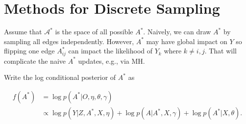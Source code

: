 \documentclass[12pt]{article}
\begin{document}
\section{Methods for Discrete Sampling}
Assume that $\mathcal{A}^\ast$ is the space of all possible $A^\ast$.
Naively, we can draw $A^\ast$ by sampling all edges independently. 
However, $A^\ast$ may have global impact on $Y$ so flipping one edge $A^\ast_{ij}$
can impact the likelihood of $Y_k$ where $k \neq i,j$. 
That will complicate the naive $A^\ast$ updates, e.g., via MH.

Write the log conditional posterior of $A^\ast$ as

\begin{equation}
    \begin{split} 
        \label{eq:conditional.A}
        f(A^\ast) &= \log p(A^\ast \vert O, \eta,\theta,\gamma) 
        \\ &\propto
        \log p(Y \vert Z,A^\ast,X,\eta) + \log p(A \vert A^\ast, X,\gamma) + \log p(A^\ast \vert X,\theta).
    \end{split}
\end{equation}
\end{document}
